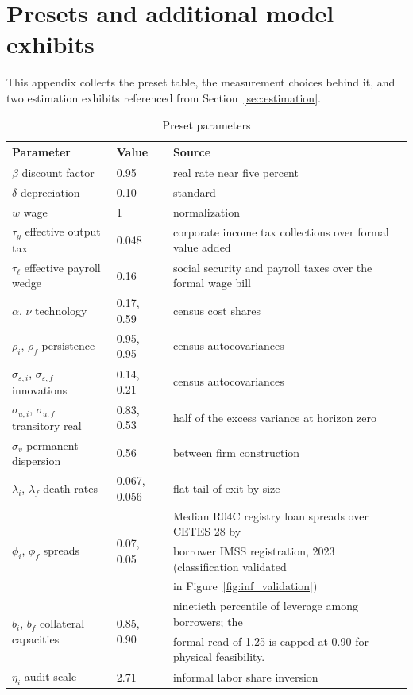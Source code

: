 \documentclass[12pt]{article}
\begin{document}
\section{Presets and additional model exhibits}
\label{app:est_detail}

This appendix collects the preset table, the measurement choices behind it, and two estimation exhibits referenced from Section~\ref{sec:estimation}.

\begin{table}[H]
    \centering\footnotesize
    \caption{Preset parameters}
    \label{tab:est-preset}
    \begin{tabular}{llll}
        \toprule
        Parameter & Value & Source \\
        \midrule
        $\beta$ discount factor & 0.95 & real rate near five percent \\
        $\delta$ depreciation & 0.10 & standard \\
        $w$ wage & 1 & normalization \\
        $\tau_{y}$ effective output tax & 0.048 & corporate income tax collections over formal value added \\
        $\tau_{\ell}$ effective payroll wedge & 0.16 & social security and payroll taxes over the formal wage bill \\
        $\alpha$, $\nu$ technology & 0.17, 0.59 & census cost shares \\
        $\rho_{i}$, $\rho_{f}$ persistence & 0.95, 0.95 & census autocovariances \\
        $\sigma_{\varepsilon,i}$, $\sigma_{\varepsilon,f}$ innovations & 0.14, 0.21 & census autocovariances \\
        $\sigma_{u,i}$, $\sigma_{u,f}$ transitory real & 0.83, 0.53 & half of the excess variance at horizon zero \\
        $\sigma_{v}$ permanent dispersion & 0.56 & between firm construction \\
        $\lambda_{i}$, $\lambda_{f}$ death rates & 0.067, 0.056 & flat tail of exit by size \\
        \multirow{3}{*}{$\phi_{i}$, $\phi_{f}$ spreads} & \multirow{3}{*}{0.07, 0.05} & Median R04C registry loan spreads over CETES 28 by \\
         &  & borrower IMSS registration, 2023 (classification validated \\
          &  & in Figure~\ref{fig:inf_validation}) \\
        \multirow{2}{*}{$b_{i}$, $b_{f}$ collateral capacities} & \multirow{2}{*}{0.85, 0.90} & ninetieth percentile of leverage among borrowers; the \\
         &  & formal read of 1.25 is capped at 0.90 for physical feasibility. \\
        $\eta_{i}$ audit scale & 2.71 & informal labor share inversion \\
        \bottomrule
    \end{tabular}
\end{table}
\end{document}
